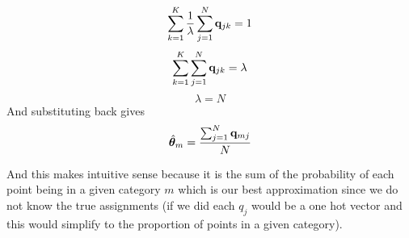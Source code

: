 \documentclass[submit]{harvardml}
\begin{document}
\begin{enumerate}
\begin{equation*}
        \end{equation*}
        \begin{equation*}
             \sum_{k = 1}^K \frac{1}{\lambda} \sum_{j=1}^N \mathbf{q}_{jk} = 1
        \end{equation*}
        \begin{equation*}
             \sum_{k = 1}^K \sum_{j=1}^N \mathbf{q}_{jk} = \lambda
        \end{equation*}
        \begin{equation*}
             \lambda = N
        \end{equation*}
        And substituting back gives
        \begin{equation*}
            \hat{\boldsymbol{\theta}}_{m} = \frac{\sum_{j=1}^N \mathbf{q}_{mj}}{N}
        \end{equation*}
        
        And this makes intuitive sense because it is the sum of the probability of each point being in a given category $m$ which is our best approximation since we do not know the true assignments (if we did each $q_j$ would be a one hot vector and this would simplify to the proportion of points in a given category). 
        

\end{enumerate}
\end{document}

